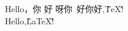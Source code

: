\documentclass[UTF8]{ctexart}
\begin{document}
 
	Hello，你 好       呀你\ 好你好,\~\TeX\~! \\
	Hello,\~\LaTeX\~!
\end{document}
